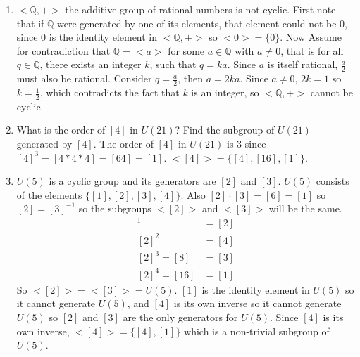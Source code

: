 \documentclass{article}
\begin{document}
\begin{enumerate}
\item $<\mathbb{Q},+>$ the additive group of rational numbers is not cyclic.  First note that if $\mathbb{Q}$ were generated by one of its elements, that element could not be 0, since 0 is the identity element in $<\mathbb{Q}, +>$ so $<0>=\{0\}$.  Now Assume for contradiction that $\mathbb{Q}=<a>$ for some $a\in\mathbb{Q}$ with $a\neq 0$, that is for all $q\in \mathbb{Q}$, there exists an integer $k$, such that $q=ka$.  Since $a$ is itself rational, $\frac{a}{2}$ must also be rational.  Consider $q=\frac{a}{2}$, then $a=2ka$.  Since $a\neq 0$, $2k=1$ so $k=\frac{1}{2}$, which contradicts the fact that $k$ is an integer, so $<\mathbb{Q},+>$ cannot be cyclic.

\item What is the order of $[4]$ in $U(21)$?  Find the subgroup of $U(21)$ generated by $[4]$.  The order of $[4]$ in $U(21)$ is 3 since $[4]^3=[4*4*4]=[64]=[1]$.  $<[4]>=\{[4],[16],[1]\}$.

\item $U(5)$ is a cyclic group and its generators are $[2]$ and $[3]$.  $U(5)$ consists of the elements $\{[1],[2],[3],[4]\}$.  Also $[2]\cdot[3]=[6]=[1]$ so $[2]=[3]^{-1}$  so the subgroups $<[2]>$ and $<[3]>$ will be the same.  \begin{align*}
    [2]^1&=[2] \\
    [2]^2&=[4] \\
    [2]^3=[8]&=[3] \\
    [2]^4=[16]&=[1]
\end{align*}
So $<[2]>=<[3]>=U(5)$. $[1]$ is the identity element in $U(5)$ so it cannot generate $U(5)$, and $[4]$ is its own inverse so it cannot generate $U(5)$ so $[2]$ and $[3]$ are the only generators for $U(5)$.  Since $[4]$ is its own inverse, $<[4]>=\{[4],[1]\}$ which is a non-trivial subgroup of $U(5)$.


\end{enumerate}
\end{document}

